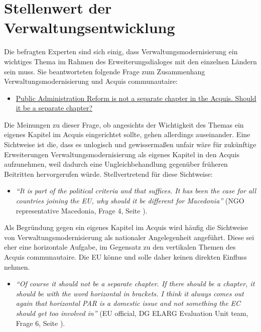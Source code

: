\section{Stellenwert der Verwaltungsentwicklung }
Die befragten Experten sind sich einig, dass Verwaltungsmodernisierung ein wichtiges Thema im Rahmen des Erweiterungsdialoges mit den einzelnen Ländern sein muss. Sie beantworteten folgende Frage zum Zusammenhang Verwaltungsmodernisierung und Acquis communautaire:
\begin{itemize}[label={}]
\item \ul{Public Administration Reform is not a separate chapter in the Acquis. Should it be a separate chapter? }
\end{itemize}

Die Meinungen zu dieser Frage, ob angesichts der Wichtigkeit des Themas ein eigenes Kapitel im Acquis eingerichtet sollte, gehen allerdings auseinander. Eine Sichtweise ist die, dass es unlogisch und gewissermaßen unfair wäre für zukünftige Erweiterungen Verwaltungsmodernisierung als eigenes Kapitel in den Acquis aufzunehmen, weil dadurch eine Ungleichbehandlung gegenüber früheren Beitritten hervorgerufen würde. Stellvertretend für diese Sichtweise:
\begin{itemize}[label={}]
\item \textit{“It is part of the political criteria and that suffices. It has been the case for all countries joining the EU, why should it be different for Macedonia”} (NGO representative Macedonia, Frage 4, Seite \pageref{sec:par chapter}).

\end{itemize}
Als Begründung gegen ein eigenes Kapitel im Acquis wird häufig die Sichtweise von Verwaltungsmodernisierung als nationaler Angelegenheit angeführt. Diese sei eher eine horizontale Aufgabe, im Gegensatz zu den vertikalen Themen des Acquis communautaire. Die EU könne und solle daher keinen direkten Einfluss nehmen.

\begin{itemize}[label={}]
\item \textit{“Of course it should not be a separate chapter. If there should be a chapter, it should be with the word horizontal in brackets. I think it always comes out again that horizontal PAR is a domestic issue and not something the EC should get too involved in”} (EU official, DG ELARG Evaluation Unit team, Frage 6, Seite \pageref{sec:chapter}).
\end{itemize}

